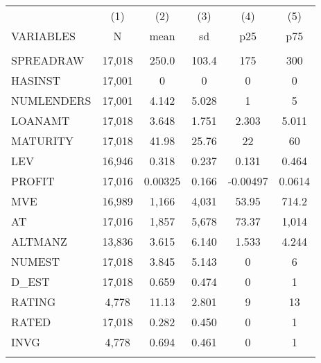 \begin{tabular}{lccccc} \hline
 & (1) & (2) & (3) & (4) & (5) \\
VARIABLES & N & mean & sd & p25 & p75 \\ \hline
 &  &  &  &  &  \\
SPREADRAW & 17,018 & 250.0 & 103.4 & 175 & 300 \\
HASINST & 17,001 & 0 & 0 & 0 & 0 \\
NUMLENDERS & 17,001 & 4.142 & 5.028 & 1 & 5 \\
LOANAMT & 17,018 & 3.648 & 1.751 & 2.303 & 5.011 \\
MATURITY & 17,018 & 41.98 & 25.76 & 22 & 60 \\
LEV & 16,946 & 0.318 & 0.237 & 0.131 & 0.464 \\
PROFIT & 17,016 & 0.00325 & 0.166 & -0.00497 & 0.0614 \\
MVE & 16,989 & 1,166 & 4,031 & 53.95 & 714.2 \\
AT & 17,016 & 1,857 & 5,678 & 73.37 & 1,014 \\
ALTMANZ & 13,836 & 3.615 & 6.140 & 1.533 & 4.244 \\
NUMEST & 17,018 & 3.845 & 5.143 & 0 & 6 \\
D\_EST & 17,018 & 0.659 & 0.474 & 0 & 1 \\
RATING & 4,778 & 11.13 & 2.801 & 9 & 13 \\
RATED & 17,018 & 0.282 & 0.450 & 0 & 1 \\
INVG & 4,778 & 0.694 & 0.461 & 0 & 1 \\
 &  &  &  &  &  \\ \hline
\end{tabular}
